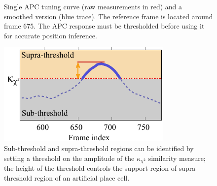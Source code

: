 %		

\begin{figure}[t]
\centering
 \setlength{}
	\setlength{}
		
		\label{fig:APCSingleNoisy}
\caption{Single APC tuning curve (raw measurements in red) and a smoothed version (blue trace).  The reference frame is located around frame 675. The APC response must be thresholded before using it for accurate position inference.}
\end{figure}


\begin{figure}
\centering
  \includegraphics[width=\linewidth]{gfx/Chapter05/tuning_curve-thresh.pdf}
\caption{Sub-threshold and supra-threshold regions can be identified by setting a threshold on the amplitude of the $\kappa_{\chi^2}$ similarity measure; the height of the threshold controls the support region of supra-threshold region of an artificial place cell.}
\label{fig:Supra}
\end{figure}




